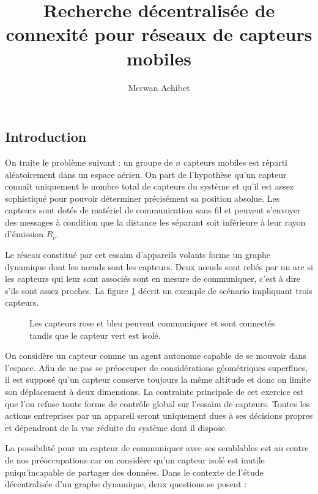 \documentclass[10pt]{article}
\title{Recherche décentralisée de connexité pour réseaux de capteurs mobiles}
\author{Merwan Achibet}
\date{}
\begin{document}
\maketitle

\begin{multicols}{2}

\section*{Introduction}

On traite le problème suivant : un groupe de $n$ capteurs mobiles est
réparti aléatoirement dans un espace aérien. On part de l'hypothèse
qu'un capteur connaît uniquement le nombre total de capteurs du
système et qu'il est assez sophistiqué pour pouvoir déterminer
précisément sa position absolue. Les capteurs sont dotés de matériel
de communication sans fil et peuvent s'envoyer des messages à
condition que la distance les séparant soit inférieure à leur rayon
d'émission $R_c$.

Le réseau constitué par cet essaim d'appareils volants forme un graphe
dynamique dont les n\oe uds sont les capteurs. Deux n\oe uds sont
reliés par un arc si les capteurs qui leur sont associés sont en
mesure de communiquer, c'est à dire s'ils sont assez proches. La
figure \ref{communication} décrit un exemple de scénario impliquant
trois capteurs.

\begin{figure}[H]

  \centering

  

  \caption{Les capteurs rose et bleu peuvent communiquer et sont
    connectés tandis que le capteur vert est isolé.}
  \label{communication}

\end{figure}

On considère un capteur comme un agent autonome capable de se mouvoir
dans l'espace. Afin de ne pas se préoccuper de considérations
géométriques superflues, il est supposé qu'un capteur conserve
toujours la même altitude et donc on limite son déplacement à deux
dimensions. La contrainte principale de cet exercice est que l'on
refuse toute forme de contrôle global sur l'essaim de capteurs. Toutes
les actions entreprises par un appareil seront uniquement dues à ses
décisions propres et dépendront de la vue réduite du système dont il
dispose.

La possibilité pour un capteur de communiquer avec ses semblables est
au centre de nos préoccupations car on considère qu'un capteur isolé
est inutile puiqu'incapable de partager des données. Dans le contexte
de l'étude décentralisée d'un graphe dynamique, deux questions se
posent :


\end{multicols}
\end{document}
